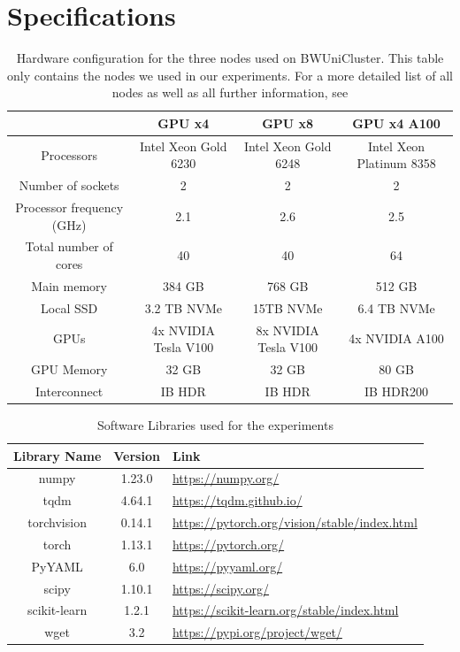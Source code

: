 \section{Specifications}
\label{sec:Appendix:Specifications}

\begin{table}
    \begin{tabular}{c | c c c} 
        \hline
         & GPU x4 & GPU x8 & GPU x4 A100 \\ 
        \hline 
        Processors & Intel Xeon Gold 6230 & Intel Xeon Gold 6248 & Intel Xeon Platinum 8358  \\ 
        Number of sockets & 2 & 2 & 2  \\ 
        Processor frequency (GHz) & 2.1 & 2.6 & 2.5  \\ 
        Total number of cores & 40 & 40 & 64  \\ 
        Main memory & 384 GB & 768 GB & 512 GB  \\ 
        Local SSD & 3.2 TB NVMe & 15TB NVMe & 6.4 TB NVMe  \\ 
        GPUs & 4x NVIDIA Tesla V100 & 8x NVIDIA Tesla V100 & 4x NVIDIA A100  \\ 
        GPU Memory & 32 GB  & 32 GB & 80 GB  \\ 
        Interconnect & IB HDR & IB HDR & IB HDR200  \\ 
        \hline
    \end{tabular}
    \caption{Hardware configuration for the three nodes used on BWUniCluster. This table only contains
    the nodes we used in our experiments. For a more detailed list of all nodes as well as all further
    information, see \cite{bwUniclusterHardware}}
    \label{fig:HardwareSpec}
\end{table}

\begin{table}
    \centering
    \begin{tabular}{c | c l } 
        \hline
        Library Name & Version & Link \\ 
        \hline 
        numpy & 1.23.0 & \url{https://numpy.org/} \\
        tqdm & 4.64.1 & \url{https://tqdm.github.io/}  \\
        torchvision & 0.14.1 & \url{https://pytorch.org/vision/stable/index.html} \\ 
        torch & 1.13.1 & \url{https://pytorch.org/} \\
        PyYAML & 6.0 & \url{https://pyyaml.org/} \\
        scipy & 1.10.1 & \url{https://scipy.org/} \\
        scikit-learn & 1.2.1 & \url{https://scikit-learn.org/stable/index.html} \\
        wget & 3.2 & \url{https://pypi.org/project/wget/} \\
        \hline
    \end{tabular}
    \caption{Software Libraries used for the experiments}
    \label{fig:Libraries}
\end{table}

